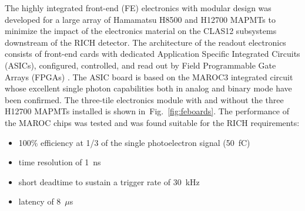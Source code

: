 
The highly integrated front-end (FE) electronics with modular design was developed for a large array of Hamamatsu H8500 and H12700 MAPMTs to minimize the impact of the electronics material on the CLAS12 subsystems downstream of the RICH detector.
The architecture of the readout electronics consists of front-end cards with dedicated Application Specific Integrated Circuits (ASICs), configured, controlled, and read out by Field Programmable Gate Arrays (FPGAs) \cite{RICH_FE}.
The ASIC board is based on the MAROC3  integrated circuit \cite{MAROC} whose excellent single photon capabilities both in analog and binary mode have been confirmed.
The three-tile electronics module with and without the three H12700 MAPMTs installed is shown in~Fig.~\ref{fig:feboards}.
The performance of the MAROC chips was tested and was found suitable for the RICH requirements:
\begin{itemize}
	\item 100\% efficiency at 1/3 of the single photoelectron signal (50~fC)
	\item time resolution of 1~ns
	\item short deadtime to sustain a trigger rate of 30~kHz
	\item latency of 8~$\mu$s
\end{itemize}

